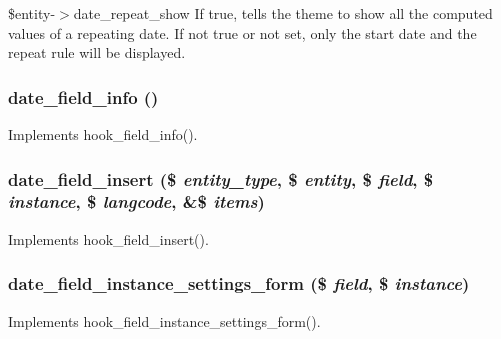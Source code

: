 \$entity-\/$>$date\_\-repeat\_\-show If true, tells the theme to show all the computed values of a repeating date. If not true or not set, only the start date and the repeat rule will be displayed. \hypertarget{date_8field_8inc_a225438cc0aa0654ee5b8c196f0566eaf}{
\subsubsection[{date\_\-field\_\-info}]{\setlength{\rightskip}{0pt plus 5cm}date\_\-field\_\-info ()}}
\label{date_8field_8inc_a225438cc0aa0654ee5b8c196f0566eaf}
Implements hook\_\-field\_\-info(). \hypertarget{date_8field_8inc_a52037db7c9418598fb3b1a424f24f4c8}{
\subsubsection[{date\_\-field\_\-insert}]{\setlength{\rightskip}{0pt plus 5cm}date\_\-field\_\-insert (\$ {\em entity\_\-type}, \/  \$ {\em entity}, \/  \$ {\em field}, \/  \$ {\em instance}, \/  \$ {\em langcode}, \/  \&\$ {\em items})}}
\label{date_8field_8inc_a52037db7c9418598fb3b1a424f24f4c8}
Implements hook\_\-field\_\-insert(). \hypertarget{date_8field_8inc_a97ac17d2d8933d34f7575b0db8f226b8}{
\subsubsection[{date\_\-field\_\-instance\_\-settings\_\-form}]{\setlength{\rightskip}{0pt plus 5cm}date\_\-field\_\-instance\_\-settings\_\-form (\$ {\em field}, \/  \$ {\em instance})}}
\label{date_8field_8inc_a97ac17d2d8933d34f7575b0db8f226b8}
Implements hook\_\-field\_\-instance\_\-settings\_\-form().

